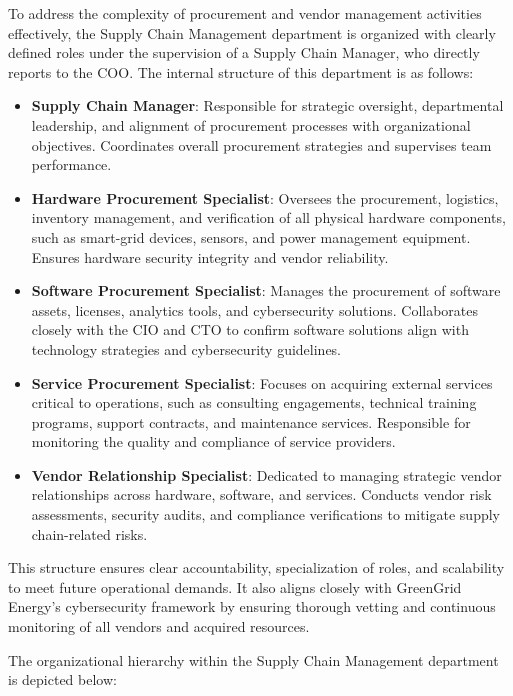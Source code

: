To address the complexity of procurement and vendor management activities effectively, the Supply Chain Management department is organized with clearly defined roles under the supervision of a Supply Chain Manager, who directly reports to the \ac{COO}. The internal structure of this department is as follows:

\begin{itemize}
    \item \textbf{Supply Chain Manager}: Responsible for strategic oversight, departmental leadership, and alignment of procurement processes with organizational objectives. Coordinates overall procurement strategies and supervises team performance.

    \item \textbf{Hardware Procurement Specialist}: Oversees the procurement, logistics, inventory management, and verification of all physical hardware components, such as smart-grid devices, sensors, and power management equipment. Ensures hardware security integrity and vendor reliability.

    \item \textbf{Software Procurement Specialist}: Manages the procurement of software assets, licenses, analytics tools, and cybersecurity solutions. Collaborates closely with the \ac{CIO} and \ac{CTO} to confirm software solutions align with technology strategies and cybersecurity guidelines.

    \item \textbf{Service Procurement Specialist}: Focuses on acquiring external services critical to operations, such as consulting engagements, technical training programs, support contracts, and maintenance services. Responsible for monitoring the quality and compliance of service providers.

    \item \textbf{Vendor Relationship Specialist}: Dedicated to managing strategic vendor relationships across hardware, software, and services. Conducts vendor risk assessments, security audits, and compliance verifications to mitigate supply chain-related risks.
\end{itemize}

This structure ensures clear accountability, specialization of roles, and scalability to meet future operational demands. It also aligns closely with GreenGrid Energy's cybersecurity framework by ensuring thorough vetting and continuous monitoring of all vendors and acquired resources.

The organizational hierarchy within the Supply Chain Management department is depicted below:

